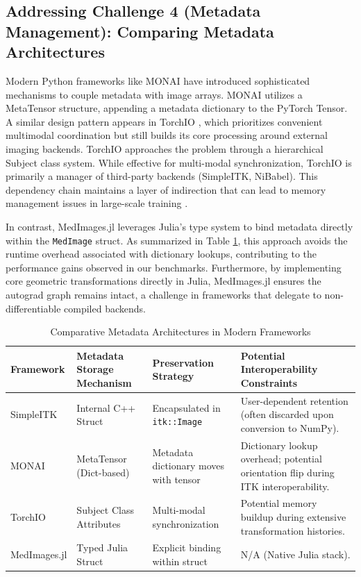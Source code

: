 \documentclass[10pt,letterpaper]{article}
\begin{document}
\subsection*{Addressing Challenge 4 (Metadata Management): Comparing Metadata Architectures}
Modern Python frameworks like MONAI \cite{CardosoLi2022} have introduced sophisticated mechanisms to couple metadata with image arrays. MONAI utilizes a MetaTensor structure, appending a metadata dictionary to the PyTorch Tensor. A similar design pattern appears in TorchIO \cite{perezgarcia2021torchio}, which prioritizes convenient multimodal coordination but still builds its core processing around external imaging backends. TorchIO approaches the problem through a hierarchical Subject class system. While effective for multi-modal synchronization, TorchIO is primarily a manager of third-party backends (SimpleITK, NiBabel). This dependency chain maintains a layer of indirection that can lead to memory management issues in large-scale training \cite{perezgarcia2021torchio}.

In contrast, MedImages.jl leverages Julia's type system to bind metadata directly within the \texttt{MedImage} struct. As summarized in Table \ref{tab:metadata_comparison}, this approach avoids the runtime overhead associated with dictionary lookups, contributing to the performance gains observed in our benchmarks. Furthermore, by implementing core geometric transformations directly in Julia, MedImages.jl ensures the autograd graph remains intact, a challenge in frameworks that delegate to non-differentiable compiled backends.

\begin{table}[H]
\centering
\caption{Comparative Metadata Architectures in Modern Frameworks}
\begin{tabular}{|p{2.5cm}|p{3.5cm}|p{3.5cm}|p{3.5cm}|}
\hline
\textbf{Framework} & \textbf{Metadata Storage Mechanism} & \textbf{Preservation Strategy} & \textbf{Potential Interoperability Constraints} \\
\hline
SimpleITK & Internal C++ Struct & Encapsulated in \texttt{itk::Image} & User-dependent retention (often discarded upon conversion to NumPy). \\
\hline
MONAI & MetaTensor (Dict-based) & Metadata dictionary moves with tensor & Dictionary lookup overhead; potential orientation flip during ITK interoperability. \\
\hline
TorchIO & Subject Class Attributes & Multi-modal synchronization & Potential memory buildup during extensive transformation histories. \\
\hline
MedImages.jl & Typed Julia Struct & Explicit binding within struct & N/A (Native Julia stack). \\
\hline
\end{tabular}
\label{tab:metadata_comparison}
\end{table}
\end{document}
